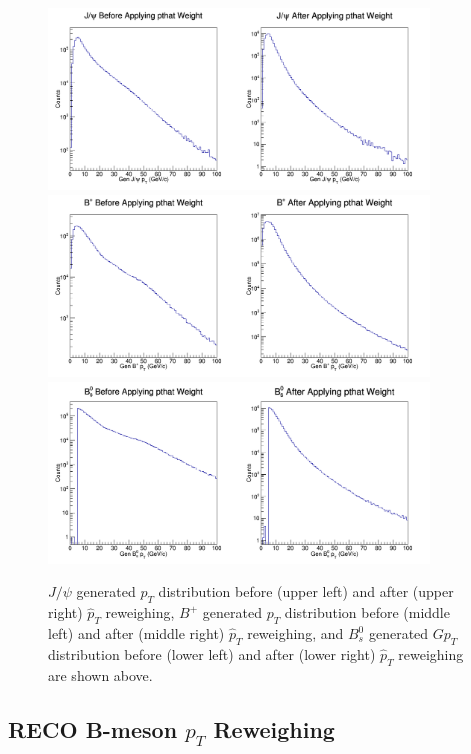 \begin{figure}[h]
\begin{center}
\includegraphics[width= 0.90\textwidth]{Figures/Chapter5/JPsiGenpT.png}
\includegraphics[width= 0.90\textwidth]{Figures/Chapter5/BPlusGenpT.png}
\includegraphics[width= 0.90\textwidth]{Figures/Chapter5/BsGenpT.png}
\caption{ $J/\psi$ generated $p_{T}$ distribution before (upper left) and after (upper right) $\hat p_{T}$ reweighing, $B^+$ generated $p_{T}$ distribution before (middle left) and after (middle right) $\hat p_{T}$ reweighing, and $B_s^0$ generated $Gp_{T}$ distribution before (lower left) and after (lower right) $\hat p_{T}$ reweighing are shown above.}
\label{GENPTDIS}
\end{center}
\end{figure}


\subsection{RECO B-meson ${p}_{T}$ Reweighing}

